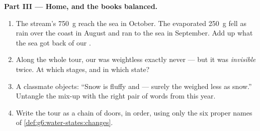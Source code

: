 \begin{problem}
\medskip\noindent\textbf{Part III --- Home, and the books
balanced.}
\begin{enumerate}[resume]
  \item The stream's \qty{750}{g} reach the sea in October. The
        evaporated \qty{250}{g} fell as rain over the coast in
        August and ran to the sea in September. Add up what the
        sea got back of our .
  \item Along the whole tour, our  was weightless exactly
        never --- but it was \emph{invisible} twice. At which
        stages, and in which state?
  \item A classmate objects: ``Snow is fluffy and  --- surely
        the  weighed less as snow.'' Untangle the mix-up
        with the right pair of words from this year.
  \item Write the tour as a chain of doors, in order, using only
        the six proper names of
        \cref{def:g6:water-states:changes}.
\end{enumerate}
\end{problem}
